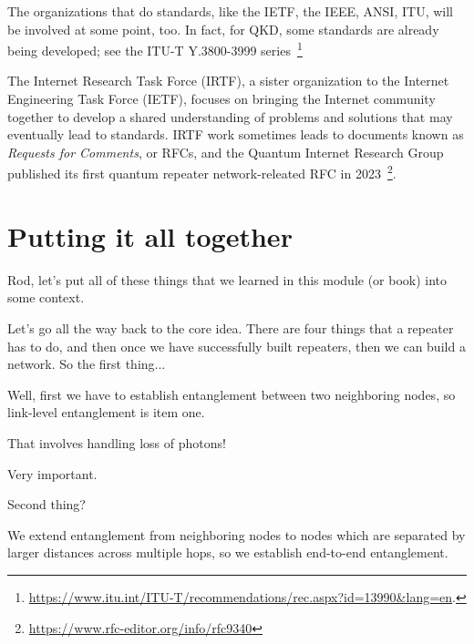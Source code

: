 \rrr The organizations that do standards, like the IETF, the IEEE, ANSI, ITU, will be involved at some point, too.  In fact, for QKD, some standards are already being developed; see the ITU-T Y.3800-3999 series~\footnote{\url{https://www.itu.int/ITU-T/recommendations/rec.aspx?id=13990&lang=en}.}

The Internet Research Task Force (IRTF), a sister organization to the Internet Engineering Task Force (IETF), focuses on bringing the Internet community together to develop a shared understanding of problems and solutions that may eventually lead to standards. IRTF work sometimes leads to documents known as \emph{Requests for Comments}, or RFCs, and the Quantum Internet Research Group published its first quantum repeater network-releated RFC in 2023~\footnote{\url{https://www.rfc-editor.org/info/rfc9340}}.

\section{Putting it all together}


\mmm Rod, let's put all of these things that we learned in this module (or book) into some context.



\rrr Let's go all the way back to the core idea. There are four things that a repeater has to do, and then once we have  successfully built repeaters, then we can build a network. So the first thing...

\mmm Well, first we have to establish entanglement between two neighboring nodes, so link-level entanglement is item one.

\rrr That involves handling loss of photons!

\mmm Very important.

\rrr Second thing?

\mmm We extend entanglement from neighboring nodes to nodes which are separated by larger distances across multiple hops, so we establish end-to-end entanglement.

